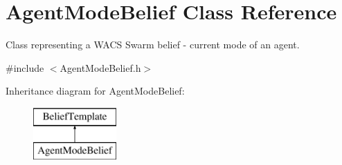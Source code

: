 \hypertarget{class_agent_mode_belief}{
\section{AgentModeBelief Class Reference}
\label{class_agent_mode_belief}
}


Class representing a WACS Swarm belief -\/ current mode of an agent.  




{\ttfamily \#include $<$AgentModeBelief.h$>$}

Inheritance diagram for AgentModeBelief:\begin{figure}[H]
\begin{center}
\leavevmode
\includegraphics[height=2.000000cm]{class_agent_mode_belief}
\end{center}
\end{figure}

